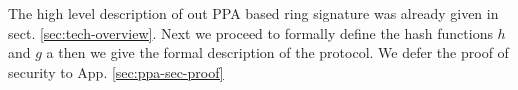 
The high level description of out PPA based ring signature was already given in sect. \ref{sec:tech-overview}. Next we proceed to formally define the hash functions $h$ and $g$ a then we give the formal description of the protocol. We defer the proof of security to App. \ref{sec:ppa-sec-proof} 






